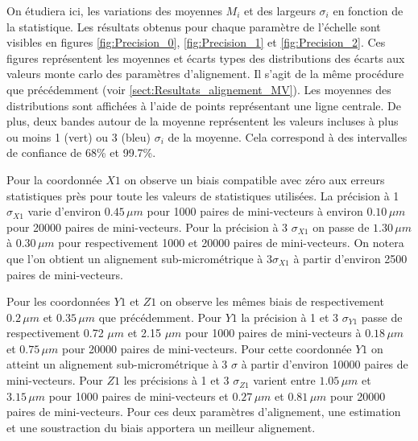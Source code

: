   On étudiera ici, les variations des moyennes $M_i$ et des largeurs $\sigma_i$ en fonction de la statistique. Les r\'esultats obtenus pour chaque param\`etre de l'\'echelle sont visibles en figures \ref{fig:Precision_0}, \ref{fig:Precision_1} et \ref{fig:Precision_2}. Ces figures repr\'esentent les moyennes et \'ecarts types des distributions des \'ecarts aux valeurs monte carlo des param\`etres d'alignement. Il s'agit de la m\^eme proc\'edure que pr\'ec\'edemment (voir \ref{sect:Resultats_alignement_MV}). Les moyennes des distributions sont affich\'ees \`a l'aide de points repr\'esentant une ligne centrale. De plus, deux bandes autour de la moyenne repr\'esentent les valeurs incluses \`a plus ou moins 1 (vert) ou 3 (bleu) $\sigma_i$ de la moyenne. Cela correspond \`a des intervalles de confiance de 68\% et 99.7\%.
  
  
  \medskip

  Pour la coordonn\'ee $X1$ on observe un biais compatible avec z\'ero aux erreurs statistiques pr\`es pour toute les valeurs de statistiques utilis\'ees. La pr\'ecision \`a 1 $\sigma_{X1}$ varie d'environ $0.45 \, \mu m$ pour 1000 paires de mini-vecteurs \`a environ $0.10 \, \mu m$ pour 20000 paires de mini-vecteurs. Pour la pr\'ecision \`a 3 $\sigma_{X1}$ on passe de $1.30 \, \mu m$ \`a $0.30 \, \mu m$ pour respectivement 1000 et 20000 paires de mini-vecteurs. On notera que l'on obtient un alignement sub-microm\'etrique \`a $3 \sigma_{X1}$ \`a partir d'environ 2500 paires de mini-vecteurs.
  
  \medskip

  Pour les coordonn\'ees $Y1$ et $Z1$ on observe les m\^emes biais de respectivement $0.2 \, \mu m$ et $0.35 \, \mu m$ que pr\'ec\'edemment. Pour $Y1$ la pr\'ecision \`a 1 et 3 $\sigma_{Y1}$ passe de respectivement 0.72 $\mu m$ et 2.15 $\mu m$ pour 1000 paires de mini-vecteurs \`a $0.18 \, \mu m$ et $0.75 \, \mu m$ pour 20000 paires de mini-vecteurs. Pour cette coordonn\'ee $Y1$ on atteint un alignement sub-microm\'etrique \`a 3 $\sigma$ \`a partir d'environ 10000 paires de mini-vecteurs. Pour $Z1$ les pr\'ecisions \`a 1 et 3 $\sigma_{Z1}$ varient entre $1.05 \, \mu m$ et $3.15 \, \mu m$ pour 1000 paires de mini-vecteurs et $0.27 \, \mu m$ et $0.81 \, \mu m$ pour 20000 paires de mini-vecteurs. Pour ces deux param\`etres d'alignement, une estimation et une soustraction du biais apportera un meilleur alignement.
  
 \medskip

